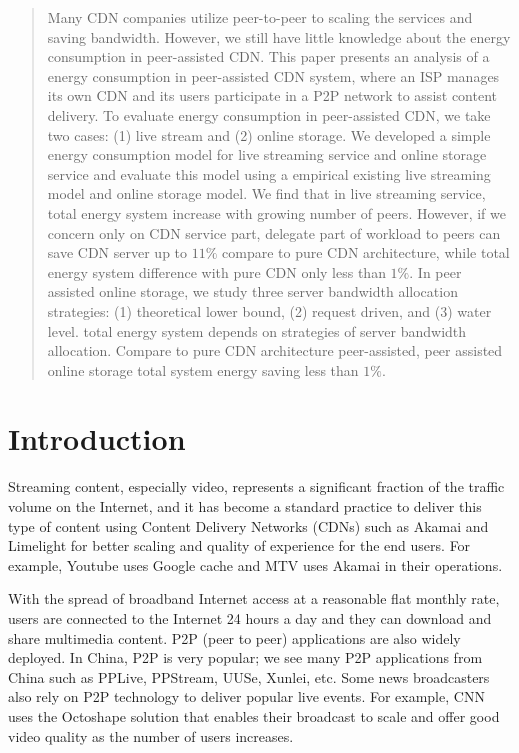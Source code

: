 \documentclass[conference]{IEEEtran}
\begin{document}
\begin{abstract}

Many CDN companies utilize peer-to-peer to scaling the services and saving bandwidth.
However, we still have little knowledge about the energy consumption in peer-assisted CDN.
This paper presents an analysis of a energy consumption in peer-assisted CDN system, where an ISP manages its own CDN and its users participate in a P2P network to assist content delivery.
To evaluate energy consumption in peer-assisted CDN, we take two cases: (1) live stream and (2) online storage.
We developed a simple energy consumption model for live streaming service and online storage service and evaluate this model using a empirical existing live streaming model and online storage model.
We find that in live streaming service, total energy system increase with growing number of peers.
However, if we concern only on CDN service part, delegate part of workload to peers can save CDN server up to $11\%$ compare to pure CDN architecture, while total energy system difference with pure CDN only less than $1\%$. 
In peer assisted online storage, we study three server bandwidth allocation strategies: (1) theoretical lower bound, (2) request driven, and (3) water level.  
total energy system depends on strategies of server bandwidth allocation.
Compare to pure CDN architecture peer-assisted, peer assisted online storage total system energy saving less than $1\%$.
\end{abstract}



\maketitle

\section{Introduction}\label{intro}
Streaming content, especially video, represents a significant fraction of the traffic volume on the Internet, and it has become a standard practice to deliver this type of content using Content Delivery Networks (CDNs) such as Akamai and Limelight for better scaling and quality of experience for the end users.  
For example, Youtube uses Google cache and MTV uses Akamai in their operations.

With the spread of broadband Internet access at a reasonable flat monthly rate, users are connected to the Internet 24 hours a day and they can download and share multimedia content.  
P2P (peer to peer) applications are also widely deployed.  
In China, P2P is very popular; we see many P2P applications from China such as PPLive, PPStream, UUSe, Xunlei, etc.  
Some news broadcasters also rely on P2P technology to deliver popular live events.  
For example, CNN uses the Octoshape solution that enables their broadcast to scale and offer good video quality as the number of users increases.
\end{document}
